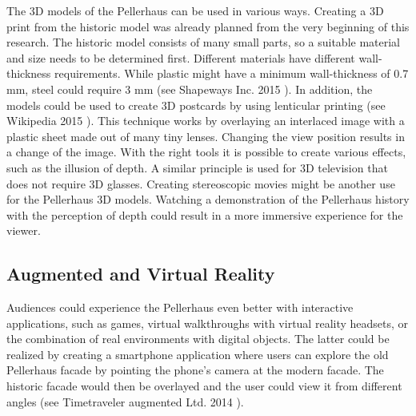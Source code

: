 The 3D models of the Pellerhaus can be used in various ways. Creating a 3D print from the historic model was already planned from the very beginning of this research. The historic model consists of many small parts, so a suitable material and size needs to be determined first. Different materials have different wall-thickness requirements. While plastic might have a minimum wall-thickness of 0.7 mm, steel could require 3 mm (see Shapeways Inc. 2015 \parencite{3dprinting_materials}). In addition, the models could be used to create 3D postcards by using lenticular printing (see Wikipedia 2015 \parencite{wiki:lenticular_printing}). This technique works by overlaying an interlaced image with a plastic sheet made out of many tiny lenses. Changing the view position results in a change of the image. With the right tools it is possible to create various effects, such as the illusion of depth. A similar principle is used for 3D television that does not require 3D glasses. Creating stereoscopic movies might be another use for the Pellerhaus 3D models. Watching a demonstration of the Pellerhaus history with the perception of depth could result in a more immersive experience for the viewer.

\subsection{Augmented and Virtual Reality}

Audiences could experience the Pellerhaus even better with interactive applications, such as games, virtual walkthroughs with virtual reality headsets, or the combination of real environments with digital objects. The latter could be realized by creating a smartphone application where users can explore the old Pellerhaus facade by pointing the phone's camera at the modern facade. The historic facade would then be overlayed and the user could view it from different angles (see Timetraveler augmented Ltd. 2014 \parencite{ytTimeTraveler} ).

